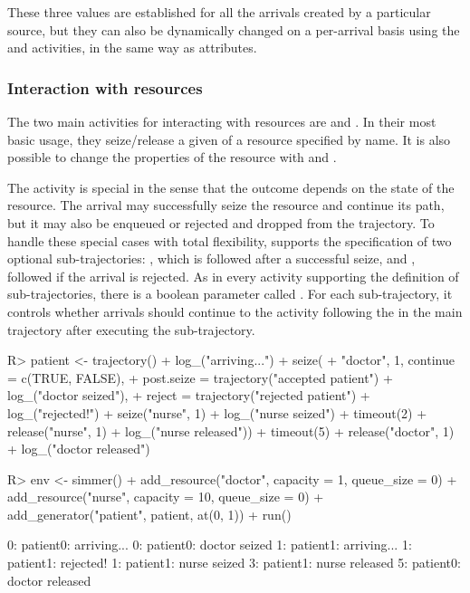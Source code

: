 \documentclass[
  nojss]{jss}
\begin{document}
These three values are established for all the arrivals created by a
particular source, but they can also be dynamically changed on a
per-arrival basis using the  and
 activities, in the same way as attributes.

\subsubsection{Interaction with
resources}\label{interaction-with-resources}

The two main activities for interacting with resources are
 and . In their most basic usage, they
seize/release a given  of a resource specified by name. It
is also possible to change the properties of the resource with
 and .

The  activity is special in the sense that the outcome
depends on the state of the resource. The arrival may successfully seize
the resource and continue its path, but it may also be enqueued or
rejected and dropped from the trajectory. To handle these special cases
with total flexibility,  supports the specification of two
optional sub-trajectories: , which is followed after a
successful seize, and , followed if the arrival is
rejected. As in every activity supporting the definition of
sub-trajectories, there is a boolean parameter called .
For each sub-trajectory, it controls whether arrivals should continue to
the activity following the  in the main trajectory after
executing the sub-trajectory.

\begin{CodeChunk}
\begin{CodeInput}
R> patient <- trajectory() %
+   log_("arriving...") %
+   seize(
+     "doctor", 1, continue = c(TRUE, FALSE),
+     post.seize = trajectory("accepted patient") %
+       log_("doctor seized"),
+     reject = trajectory("rejected patient") %
+       log_("rejected!") %
+       seize("nurse", 1) %
+       log_("nurse seized") %
+       timeout(2) %
+       release("nurse", 1) %
+       log_("nurse released")) %
+   timeout(5) %
+   release("doctor", 1) %
+   log_("doctor released")
\end{CodeInput}
\end{CodeChunk}

\begin{CodeChunk}
\begin{CodeInput}
R> env <- simmer() %
+   add_resource("doctor", capacity = 1, queue_size = 0) %
+   add_resource("nurse", capacity = 10, queue_size = 0) %
+   add_generator("patient", patient, at(0, 1)) %
+   run()
\end{CodeInput}
\begin{CodeOutput}
0: patient0: arriving...
0: patient0: doctor seized
1: patient1: arriving...
1: patient1: rejected!
1: patient1: nurse seized
3: patient1: nurse released
5: patient0: doctor released
\end{CodeOutput}
\end{CodeChunk}
\end{document}
